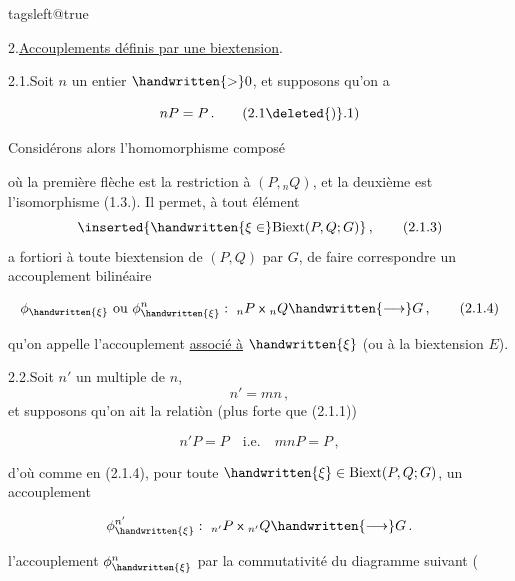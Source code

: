 \begingroup\csname tagsleft@true\endcsname

2.\quad \uline{Accouplements définis par une biextension}.

2.1.\quad Soit $n$ un entier $\handwritten{>}0$, et supposons qu'on a

\[nP=P\,.\tag*{(2.1\deleted{)}.1)}\]

Considérons alors l'homomorphisme composé


où la première flèche est la restriction à $(P,{}_nQ)$, et la deuxième est l'isomorphisme (1.3.). Il permet, à tout élément
\[\inserted{\handwritten{\xi\in}\mathrm{Biext}(P,Q;G)}\,,\tag*{(2.1.3)}\]
a fortiori à toute biextension de $(P,Q)$ par $G$, de faire correspondre un accouplement bilinéaire


\[\phi_{\handwritten{\xi}}\ \text{ou}\ \phi_{\handwritten{\xi}}^n:\ {}_nP\;\mathsf{x}\;{}_nQ\handwritten{\longrightarrow}G\,,\tag*{(2.1.4)}\]

qu'on appelle l'accouplement \uline{associé à} $\handwritten{\xi}$ (ou à la biextension $E$).

2.2.\quad Soit  $n'$ un multiple de $n$,
\[n'=mn\,,\]
et supposons qu'on ait la relatiòn (plus forte que (2.1.1))

\[n'P=P\quad\text{i.e.}\quad mnP=P\,,\tag*{(2.2.1)}\]

d'où comme en (2.1.4), pour toute $\handwritten{\xi}\in\mathrm{Biext}(P,Q;G)$, un accouplement

\[\phi_{\handwritten{\xi}}^{n'}:\ {}_{n'}P\;\mathsf{x}\;{}_{n'}Q\handwritten{\longrightarrow}G\,.\]

 l'accouplement $\phi_{\handwritten{\xi}}^n$  par la commutativité du diagramme suivant (

